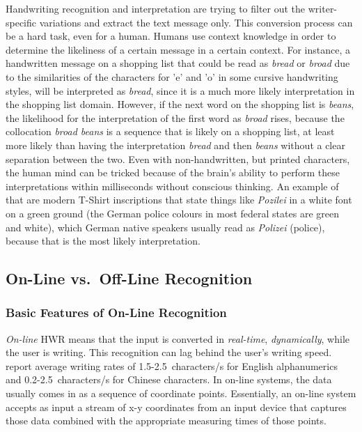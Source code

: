 Handwriting recognition and interpretation are trying to filter out the 
writer-specific variations and extract the text message only. This conversion
process can be a hard task, even for a human. Humans use context knowledge
in order to determine the likeliness of a certain message in a certain context.
For instance, a handwritten message on a shopping list that could be read
as \emph{bread} or \emph{broad} due to the similarities of the characters 
for 'e' and 'o' in some cursive handwriting styles, will be interpreted 
as \emph{bread}, since it is a much more likely interpretation in the 
shopping list domain. However, if the next word on the shopping list 
is \emph{beans}, the likelihood for the interpretation of the first word
as \emph{broad} rises, because the collocation \emph{broad beans} is a
sequence that is likely on a shopping list, at least more likely than
having the interpretation \emph{bread} and then \emph{beans} without a
clear separation between the two. Even with non-handwritten, 
but printed characters, the human mind can be tricked because of the 
brain's ability to perform these interpretations within milliseconds 
without conscious thinking. An example of that are modern T-Shirt inscriptions
that state things like \emph{Pozilei} in a white font on a green ground 
(the German police colours in most federal states are green and white), 
which German native speakers usually read as \emph{Polizei} (police),
because that is the most likely interpretation.

\subsection{On-Line vs.\ Off-Line Recognition}
\label{sec:onlinevsoffline}


\subsubsection{Basic Features of On-Line Recognition}
\label{sec:basicfeaturesofonlinerecognition}

\emph{On-line} HWR means that the input is converted in \emph{real-time}, 
\emph{dynamically}, while the user is writing. This recognition can lag behind
the user's writing speed. ~\citeyear{Tappert1990} report 
average writing rates of 1.5-2.5~characters/s for English alphanumerics and
0.2-2.5~characters/s for Chinese characters. In on-line systems, 
the data usually comes in as a sequence of coordinate points. 
Essentially, an on-line system accepts as input a stream of x-y coordinates 
from an input device that captures those data
combined with the appropriate measuring times of those points.

